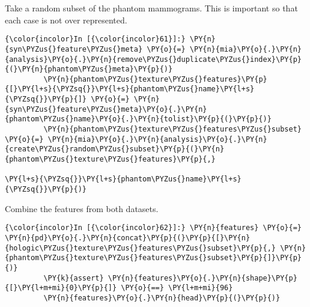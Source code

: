     Take a random subset of the phantom mammograms. This is important so
that each case is not over represented.

    \begin{Verbatim}[commandchars=\\\{\}]
{\color{incolor}In [{\color{incolor}61}]:} \PY{n}{syn\PYZus{}feature\PYZus{}meta} \PY{o}{=} \PY{n}{mia}\PY{o}{.}\PY{n}{analysis}\PY{o}{.}\PY{n}{remove\PYZus{}duplicate\PYZus{}index}\PY{p}{(}\PY{n}{phantom\PYZus{}meta}\PY{p}{)}
         \PY{n}{phantom\PYZus{}texture\PYZus{}features}\PY{p}{[}\PY{l+s}{\PYZsq{}}\PY{l+s}{phantom\PYZus{}name}\PY{l+s}{\PYZsq{}}\PY{p}{]} \PY{o}{=} \PY{n}{syn\PYZus{}feature\PYZus{}meta}\PY{o}{.}\PY{n}{phantom\PYZus{}name}\PY{o}{.}\PY{n}{tolist}\PY{p}{(}\PY{p}{)}
         \PY{n}{phantom\PYZus{}texture\PYZus{}features\PYZus{}subset} \PY{o}{=} \PY{n}{mia}\PY{o}{.}\PY{n}{analysis}\PY{o}{.}\PY{n}{create\PYZus{}random\PYZus{}subset}\PY{p}{(}\PY{n}{phantom\PYZus{}texture\PYZus{}features}\PY{p}{,}
                                                                             \PY{l+s}{\PYZsq{}}\PY{l+s}{phantom\PYZus{}name}\PY{l+s}{\PYZsq{}}\PY{p}{)}
\end{Verbatim}

    Combine the features from both datasets.

    \begin{Verbatim}[commandchars=\\\{\}]
{\color{incolor}In [{\color{incolor}62}]:} \PY{n}{features} \PY{o}{=} \PY{n}{pd}\PY{o}{.}\PY{n}{concat}\PY{p}{(}\PY{p}{[}\PY{n}{hologic\PYZus{}texture\PYZus{}features\PYZus{}subset}\PY{p}{,} \PY{n}{phantom\PYZus{}texture\PYZus{}features\PYZus{}subset}\PY{p}{]}\PY{p}{)}
         \PY{k}{assert} \PY{n}{features}\PY{o}{.}\PY{n}{shape}\PY{p}{[}\PY{l+m+mi}{0}\PY{p}{]} \PY{o}{==} \PY{l+m+mi}{96}
         \PY{n}{features}\PY{o}{.}\PY{n}{head}\PY{p}{(}\PY{p}{)}
\end{Verbatim}


